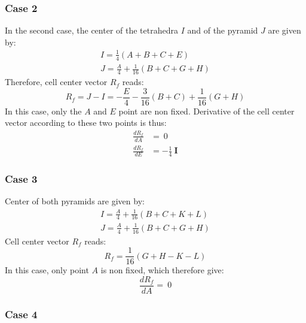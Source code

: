 \documentclass[11pt]{article}
\begin{document}
\subsubsection*{Case 2}

In the second case, the center of the tetrahedra $I$ and of the pyramid $J$ are given by:
\begin{subequations}
\begin{gather}
I = \frac{1}{4} (A + B + C + E) \\
J = \frac{A}{4} + \frac{1}{16} (B + C + G + H)
\end{gather}
\end{subequations} 
Therefore, cell center vector $R_f$ reads:
\begin{equation}
R_f = J-I = -\frac{E}{4} - \frac{3}{16} (B + C) + \frac{1}{16} ( G + H)
\end{equation}
In this case, only the $A$ and $E$ point are non fixed. Derivative of the cell center vector according to these two points is thus:
\begin{subequations}
\begin{align}
\frac{d R_f}{d A} &= \ 0 \\
\frac{d R_f}{d E} &= - \frac{1}{4}\ \boldsymbol{I}
\end{align}
\end{subequations}


\subsubsection*{Case 3}

Center of both pyramids are given by:
\begin{subequations}
\begin{gather}
I = \frac{A}{4} + \frac{1}{16} (B + C + K + L) \\
J = \frac{A}{4} + \frac{1}{16} (B + C + G + H)
\end{gather}
\end{subequations} 
Cell center vector $R_f$ reads:
\begin{equation}
R_f = \frac{1}{16} ( G + H - K - L)
\end{equation}
In this case, only point $A$ is non fixed, which therefore give:
\begin{equation}
\frac{d R_f}{d A} = \ 0 
\end{equation}


\subsubsection*{Case 4}
\end{document}
